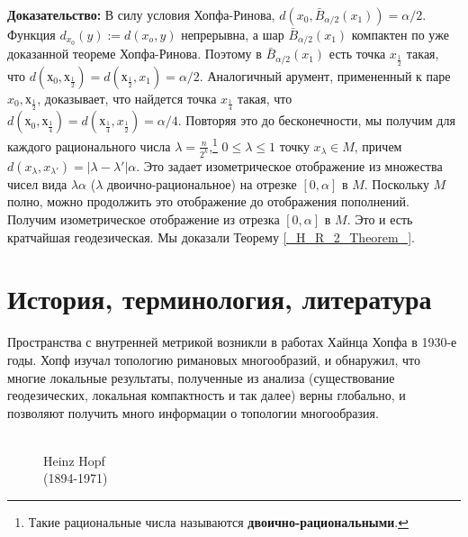 \documentclass[12pt]{book}
\theoremstyle{upshape}
\theoremstyle{generic}
\theoremstyle{upshapenonumber}
\newcommand{\следствие}{%
     \refstepcounter{teorema}
     {\noindent\bf Следствие \thechapter.\arabic{teorema}:\ }}
\newcommand{\пример}{%
     \refstepcounter{teorema}
     {\noindent\bf Пример \thechapter.\arabic{teorema}:\ }}
\newcommand{\лемма}{%
     \refstepcounter{teorema}
     {\noindent\bf Лемма \thechapter.\arabic{teorema}:\ }}
\newcommand{\теорема}{%
     \refstepcounter{teorema}
     {\noindent\bf Теорема \thechapter.\arabic{teorema}:\ }}
\newcommand{\утверждение}{%
     \refstepcounter{teorema}
     {\noindent\bf Утверждение \thechapter.\arabic{teorema}:\ }}
\def\ноиндент{\noindent}
\def\бф{\bf}
\begin{document}
\ноиндент
{\бф Доказательство:} 
В силу условия Хопфа-Ринова, $d(x_0, \bar B_{\alpha/2}(x_1))=\alpha/2$.
Функция $d_{x_0}(y):= d(x_o,y)$ непрерывна, а шар $\bar B_{\alpha/2}(x_1)$
компактен по уже доказанной теореме Хопфа-Ринова. Поэтому
в $\bar B_{\alpha/2}(x_1)$ есть точка $x_{\frac 1 2}$ такая, что
$d(х_0, х_{\frac 1 2}) = d(х_{\frac 1 2}, x_1)= \alpha/2$.
Аналогичный арумент, примененный к паре $x_0, х_{\frac 1 2}$,
доказывает, что найдется точка $x_{\frac 14}$ такая, что
$d(х_0, х_{\frac 1 4}) = d(х_{\frac 1 4}, x_{\frac 1 2})=\alpha/4$.
Повторяя это до бесконечности, мы получим для
каждого рационального числа $\lambda =
\frac{n}{2^k}$,\footnote{Такие рациональные числа
называются {\бф двоично-рациональными}.}
$0\leq \lambda\leq 1$ точку $x_\lambda\in M$, причем
$d(x_\lambda, x_{\lambda'})= |\lambda-\lambda'|\alpha$.
Это задает изометрическое отображение из множества
чисел вида $\lambda\alpha$ ($\lambda$ двоично-рациональное)
на отрезке $[0, \alpha]$ в $M$. Поскольку $M$ полно,
можно продолжить это отображение до отображения
пополнений. Получим изометрическое отображение
из отрезка $[0, \alpha]$ в $M$. Это и есть 
кратчайшая геодезическая. Мы доказали 
Теорему \ref{_H_R_2_Theorem_}.




\section{История, терминология, литература}


Пространства с внутренней метрикой возникли в
работах Хайнца Хопфа в 1930-е годы. Хопф изучал
топологию римановых многообразий, и обнаружил,
что многие локальные результаты, полученные
из анализа (существование геодезических,
локальная компактность и так далее) верны
глобально, и позволяют получить много 
информации о топологии многообразия.




\begin{figure}[ht]
\begin{center}
\\
Heinz Hopf \\
(1894-1971)
\end{center}
\end{figure}
\end{document}
